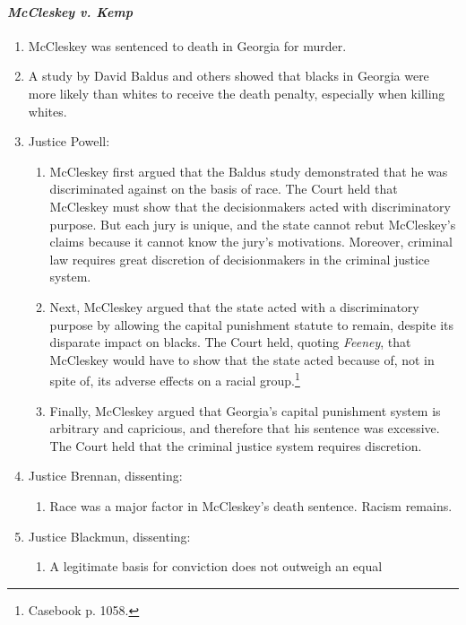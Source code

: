 \paragraph{\emph{McCleskey v. Kemp}}

\begin{enumerate}
    \item McCleskey was sentenced to death in Georgia for murder.
    \item A study by David Baldus and others showed that blacks in Georgia 
    were more likely than whites to receive the death penalty, especially when 
    killing whites.
    \item Justice Powell:
    \begin{enumerate}
        \item McCleskey first argued that the Baldus study demonstrated that 
        he was discriminated against on the basis of race. The Court held that 
        McCleskey must show that the decisionmakers acted with discriminatory 
        purpose. But each jury is unique, and the state cannot rebut 
        McCleskey's claims because it cannot know the jury's motivations. 
        Moreover, criminal law requires great discretion of decisionmakers in 
        the criminal justice system.
        \item Next, McCleskey argued that the state acted with a 
        discriminatory purpose by allowing the capital punishment statute to 
        remain, despite its disparate impact on blacks. The Court held, 
        quoting \emph{Feeney}, that McCleskey would have to show that the 
        state acted because of, not in spite of, its adverse effects on a 
        racial group.\footnote{Casebook p. 1058.}
        \item Finally, McCleskey argued that Georgia's capital punishment 
        system is arbitrary and capricious, and therefore that his sentence 
        was excessive. The Court held that the criminal justice system 
        requires discretion.
    \end{enumerate}
    \item Justice Brennan, dissenting:
    \begin{enumerate}
        \item Race was a major factor in McCleskey's death sentence. Racism 
        remains.
    \end{enumerate}
    \item Justice Blackmun, dissenting:
    \begin{enumerate}
        \item A legitimate basis for conviction does not outweigh an equal 

\end{enumerate}
\end{enumerate}
